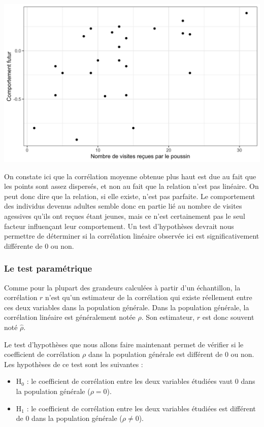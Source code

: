 \documentclass[a4paperpaper,]{article}
\providecommand{\tightlist}{%
  \setlength{\itemsep}{0pt}\setlength{\parskip}{0pt}}
\begin{document}
\begin{center}\includegraphics[width=0.9\linewidth]{figure/unnamed-chunk-103-1} \end{center}

On constate ici que la corrélation moyenne obtenue plus haut est due au fait que les points sont assez dispersés, et non au fait que la relation n'est pas linéaire. On peut donc dire que la relation, si elle existe, n'est pas parfaite. Le comportement des individus devenus adultes semble donc en partie lié au nombre de visites agessives qu'ils ont reçues étant jeunes, mais ce n'est certainement pas le seul facteur influençant leur comportement. Un test d'hypothèses devrait nous permettre de déterminer si la corrélation linéaire observée ici est significativement différente de 0 ou non.

\hypertarget{le-test-paramuxe9trique-4}{%
\subsubsection{Le test paramétrique}\label{le-test-paramuxe9trique-4}}

Comme pour la plupart des grandeurs calculées à partir d'un échantillon, la corrélation \(r\) n'est qu'un estimateur de la corrélation qui existe réellement entre ces deux variables dans la population générale. Dans la population générale, la corrélation linéaire est généralement notée \(\rho\). Son estimateur, \(r\) est donc souvent noté \(\hat{\rho}\).

Le test d'hypothèses que nous allons faire maintenant permet de vérifier si le coefficient de corrélation \(\rho\) dans la population générale est différent de 0 ou non. Les hypothèses de ce test sont les suivantes :

\begin{itemize}
\tightlist
\item
  H\(_0\) : le coefficient de corrélation entre les deux variables étudiées vaut 0 dans la population générale (\(\rho = 0\)).
\item
  H\(_1\) : le coefficient de corrélation entre les deux variables étudiées est différent de 0 dans la population générale (\(\rho \neq 0\)).
\end{itemize}
\end{document}
